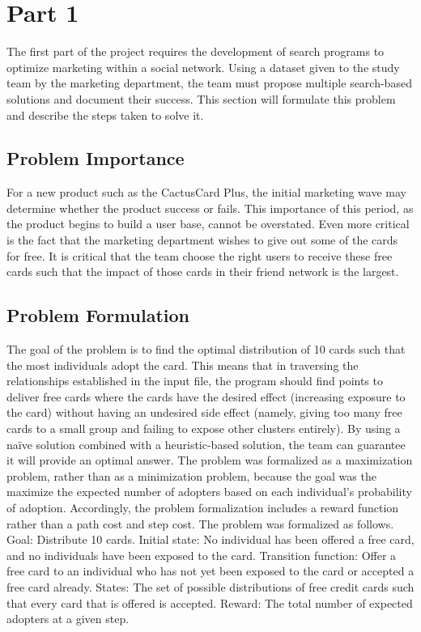 \documentclass[11pt,journal]{IEEEtran}
\begin{document}
\IEEEpeerreviewmaketitle

\section{Part 1} \label{part1}
The first part of the project requires the development of search programs to optimize marketing within a social network. Using a dataset given to the study team by the marketing department, the team must propose multiple search-based solutions and document their success. This section will formulate this problem and describe the steps taken to solve it.

\subsection{Problem Importance}
For a new product such as the CactusCard Plus, the initial marketing wave may determine whether the product success or fails. This importance of this period, as the product begins to build a user base, cannot be overstated. Even more critical is the fact that the marketing department wishes to give out some of the cards for free. It is critical that the team choose the right users to receive these free cards such that the impact of those cards in their friend network is the largest.

\subsection{Problem Formulation}
The goal of the problem is to find the optimal distribution of 10 cards such that the most individuals adopt the card. This means that in traversing the relationships established in the input file, the program should find points to deliver free cards where the cards have the desired effect (increasing exposure to the card) without having an undesired side effect (namely, giving too many free cards to a small group and failing to expose other clusters entirely). By using a na{\"i}ve solution combined with a heuristic-based solution, the team can guarantee it will provide an optimal answer. The problem was formalized as a maximization problem, rather than as a minimization problem, because the goal was the maximize the expected number of adopters based on each individual's probability of adoption. Accordingly, the problem formalization includes a reward function rather than a path cost and step cost. The problem was formalized as follows. Goal: Distribute 10 cards. Initial state: No individual has been offered a free card, and no individuals have been exposed to the card. Transition function: Offer a free card to an individual who has not yet been exposed to the card or accepted a free card already. States: The set of possible distributions of free credit cards such that every card that is offered is accepted. Reward: The total number of expected adopters at a given step.
\end{document}
